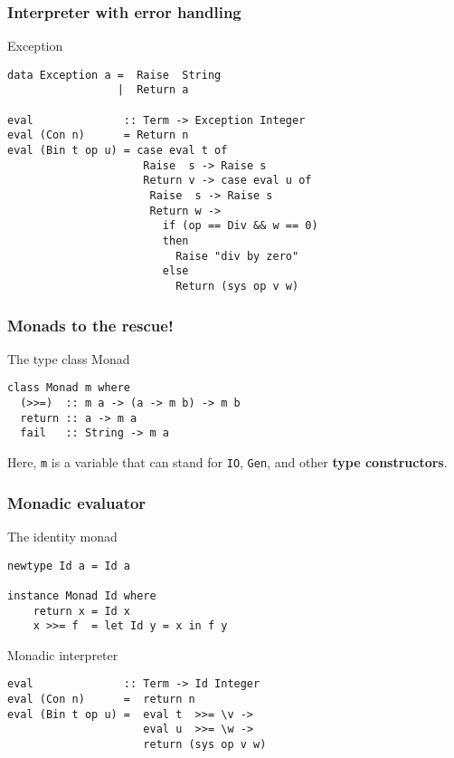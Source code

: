 \documentclass{beamer}
\begin{document}
\begin{frame}[fragile]
  \frametitle{Interpreter with error handling}
  \begin{block}{Exception}
\begin{verbatim}
data Exception a =  Raise  String
                 |  Return a

eval              :: Term -> Exception Integer
eval (Con n)      = Return n
eval (Bin t op u) = case eval t of
                     Raise  s -> Raise s
                     Return v -> case eval u of
                      Raise  s -> Raise s
                      Return w ->
                        if (op == Div && w == 0)
                        then  
                          Raise "div by zero"
                        else                                  
                          Return (sys op v w)
\end{verbatim}
\end{block}     
\end{frame}             


\begin{frame}[fragile]
  \frametitle{Monads to the rescue!}
\begin{block}{The type class Monad}
\begin{verbatim}
class Monad m where
  (>>=)  :: m a -> (a -> m b) -> m b
  return :: a -> m a
  fail   :: String -> m a
\end{verbatim}
  Here, \texttt{m} is a variable that can stand for \texttt{IO}, \texttt{Gen}, and other \textbf{type constructors}.
\end{block}
\end{frame}     


\begin{frame}[fragile]
  \frametitle{Monadic evaluator}
  \begin{alertblock}{The identity monad}
\begin{verbatim}
newtype Id a = Id a

instance Monad Id where
    return x = Id x
    x >>= f  = let Id y = x in f y
\end{verbatim}  
\end{alertblock}

\begin{exampleblock}{Monadic interpreter}
\begin{verbatim}
eval              :: Term -> Id Integer
eval (Con n)      =  return n
eval (Bin t op u) =  eval t  >>= \v ->
                     eval u  >>= \w ->
                     return (sys op v w)
\end{verbatim}  
\end{exampleblock}
\end{frame}             
\end{document}
